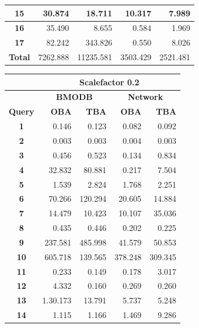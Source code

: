 \documentclass[a4paper]{article}
\begin{document}
\begin{figure}[h]
\begin{minipage}{0.5\linewidth}
\begin{tiny}
\begin{tabular}{|c|r|r|r|r|}
        \hline
        \textbf{15}&30.874&18.711&10.317&7.989\\
        \hline
        \textbf{16}&35.490&8.655&0.584&1.969\\
        \hline
        \textbf{17}&82.242&343.826&0.550&8.026\\
        \hline
        \textbf{Total}&7262.888&11235.581&3503.429&2521.481\\
        \hline
      \end{tabular}
    \end{tiny}
  \end{minipage}\hfill
  \begin{minipage}{0.5\linewidth}
    \begin{tiny}
      \begin{tabular}{|c|r|r|r|r|}
        \hline
        &\multicolumn{4}{c|}{\textbf{Scalefactor 0.2}}\\
        \hline
        &\multicolumn{2}{c|}{\textbf{BMODB}}&\multicolumn{2}{c|}{\textbf{Network}}\\
        \hline
        \textbf{Query}&\textbf{OBA}&\textbf{TBA}&\textbf{OBA}&\textbf{TBA}\\
        \hline
        \textbf{1}&0.146&0.123&0.082&0.092\\
        \hline
        \textbf{2}&0.003&0.003&0.004&0.003\\
        \hline
        \textbf{3}&0.456&0.523&0.134&0.834\\
        \hline
        \textbf{4}&32.832&80.881&0.217&7.504\\
        \hline
        \textbf{5}&1.539&2.824&1.768&2.251\\
        \hline
        \textbf{6}&70.266&120.294&20.605&14.884\\
        \hline
        \textbf{7}&14.479&10.423&10.107&35.036\\
        \hline
        \textbf{8}&0.435&0.446&0.202&0.225\\
        \hline
        \textbf{9}&237.581&485.998&41.579&50.853\\
        \hline
        \textbf{10}&605.718&139.565&378.248&309.345\\
        \hline
        \textbf{11}&0.233&0.149&0.178&3.017\\
        \hline
        \textbf{12}&4.332&0.160&0.269&0.260\\
        \hline
        \textbf{13}&1.30.173&13.791&5.737&5.248\\
        \hline
        \textbf{14}&1.115&1.166&1.469&9.286\\

\end{tabular}
\end{tiny}
\end{minipage}
\end{figure}
\end{document}
